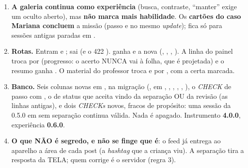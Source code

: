 \begin{enumerate}
{    atingiu}; no chute, 1 em 9 atinge. A resposta traz a \textbf{revelação} ---
    as peças escolhidas, as certas e o  (,
     ou , com a área em foco do feed DESTA criança,
    , ) ---, que a tela mostra antes
    de seguir para o caso Mariana. \enquote{Ficar muito tempo} não é
    distrator, de propósito: o motor pesa a permanência, e a peça seria meio
    certa.
  \item \textbf{A galeria continua como experiência} (busca, contraste,
    \enquote{manter} exige um oculto aberto), mas \textbf{não marca mais
    habilidade}. Os \textbf{cartões do caso Mariana concluem} a missão (passo
     e  no mesmo \emph{update});
     fica só para sessões antigas paradas em
    .
  \item \textbf{Rotas.} Entram  e
    ; sai  (e o
    422 ).  ganha
     e a  nova (, , ,
    ). A linha do painel troca  por
     (progresso: o acerto NUNCA vai à folha, que é projetada) e o
    resumo ganha . O material do professor troca  e
     por , com a certa marcada.
  \item \textbf{Banco.} Seis colunas novas em ,
    na migração 
    (, em ,
    , ,
    , , ), o
    \emph{CHECK} de passo com , o de status que aceita
     vindo da separação OU da revisão (as linhas
    antigas), e dois \emph{CHECKs} novos, fracos de propósito: uma sessão da
    0.5.0 em  sem separação continua válida. Nada é apagado.
    Instrumento \textbf{4.0.0}, experiência \textbf{0.6.0}.
  \item \textbf{O que NÃO é segredo, e não se finge que é}: o feed já entrega ao
    aparelho a área de cada post (a \emph{hashtag} que a criança viu). A
    separação tira a resposta da TELA; quem corrige é o servidor (regra 3).
\end{enumerate}

